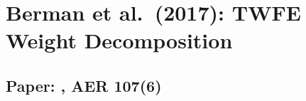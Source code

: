\documentclass[12pt]{article}
\begin{document}
\section*{Berman et al.\ (2017): TWFE Weight Decomposition}
\subsection*{Paper: , AER 107(6)}




\end{document}
